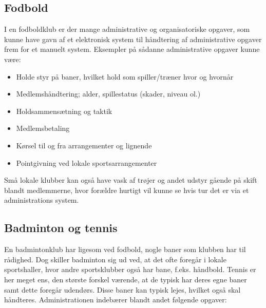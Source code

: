 %
%


\subsection{Fodbold} \label{Fodbold}
I en fodboldklub er der mange administrative og organisatoriske opgaver, som kunne have gavn af et elektronisk system
til håndtering af administrative opgaver frem for et manuelt system. Eksempler på sådanne
administrative opgaver kunne være:

\begin{itemize}
\item Holde styr på baner, hvilket hold som spiller/træner hvor og hvornår
\item Medlemshåndtering; alder, spillestatus (skader, niveau ol.)
\item Holdsammensætning og taktik
\item Medlemsbetaling
\item Kørsel til og fra arrangementer og lignende
\item Pointgivning ved lokale sportsarrangementer
\end{itemize}

Små lokale klubber kan også have vask af trøjer og andet udstyr gående på skift blandt medlemmerne, hvor forældre hurtigt vil kunne se hvis tur det er via et administrations system. 

\subsection{Badminton og tennis}

En badmintonklub har ligesom ved fodbold, nogle baner som klubben har til rådighed. Dog skiller badminton sig ud ved, at det ofte foregår i lokale sportshaller, hvor andre sportsklubber også har bane, f.eks. håndbold. Tennis er her meget ens, den største forskel værende, at de typisk har deres egne baner samt dette foregår udendørs. Disse baner kan typisk lejes, hvilket også skal håndteres. Administrationen indebærer blandt andet følgende opgaver:

